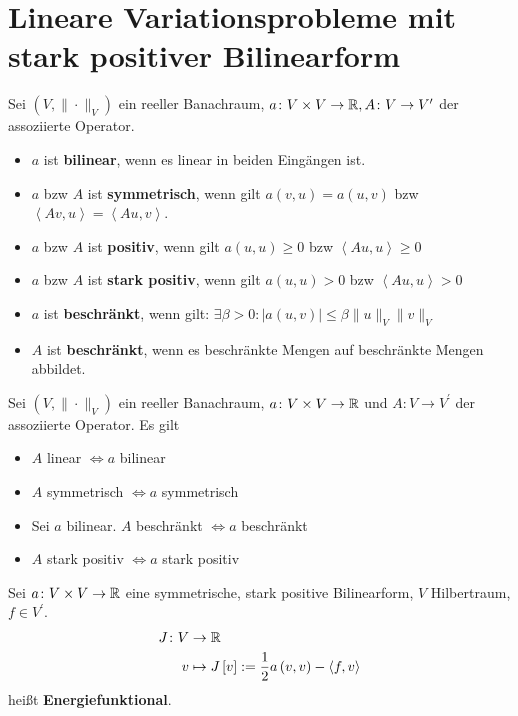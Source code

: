 \section{Lineare Variationsprobleme mit stark positiver Bilinearform}
\begin{definition}
	Sei $\left(V,\|\cdot\|_{V}\right)$ ein reeller Banachraum, $a\colon V\times V\to\mathbb{R}, A\colon V\to V^{\prime}$ der assoziierte Operator.
	\begin{itemize}
		\item $a$ ist \textbf{bilinear}, wenn es linear in beiden Eingängen ist.
		\item $a$ bzw $A$ ist \textbf{symmetrisch}, wenn gilt $a\left(v,u\right) = a\left(u,v\right)$ bzw $\left<Av,u\right>=\left<Au,v\right>$.{}
		\item $a$ bzw $A$ ist \textbf{positiv}, wenn gilt $a\left(u,u\right)\geq 0$ bzw $\left<Au,u\right>\geq 0$
		\item $a$ bzw $A$ ist \textbf{stark positiv}, wenn gilt $a\left(u,u\right) > 0$ bzw $\left<Au,u\right> > 0$
		\item $a$ ist \textbf{beschränkt}, wenn gilt: $\exists\beta >0\colon |a\left(u,v\right)|\leq\beta\|u\|_{V}\|v\|_{V}$
		\item $A$ ist \textbf{beschränkt}, wenn es beschränkte Mengen auf beschränkte Mengen abbildet.
	\end{itemize}
\end{definition}

\begin{lemma}
	Sei $\left(V,\|\cdot\|_{V}\right)$ ein reeller Banachraum, $a\colon V\times V\to\mathbb{R}$ und $A\colon V\to V^{\prime}$ der assoziierte Operator.
	Es gilt
	\begin{itemize}
		\item $A$ linear $\Leftrightarrow a$ bilinear
		\item $A$ symmetrisch $\Leftrightarrow a$ symmetrisch
		\item Sei $a$ bilinear. $A$ beschränkt $\Leftrightarrow a$ beschränkt
		\item $A$ stark positiv $\Leftrightarrow a$ stark positiv
	\end{itemize}
\end{lemma}

\begin{definition}
	Sei $a\colon V\times V\to\mathbb{R}$ eine symmetrische, stark positive Bilinearform, $V$ Hilbertraum, $f\in V^{\prime}$. 
	\begin{align*}
		J\colon V &\to\mathbb{R} \\
			v &\mapsto J\left[v\right] := \frac{1}{2}a\left(v,v\right) - \left<f,v\right>
	\end{align*}
	heißt \textbf{Energiefunktional}.
\end{definition}

